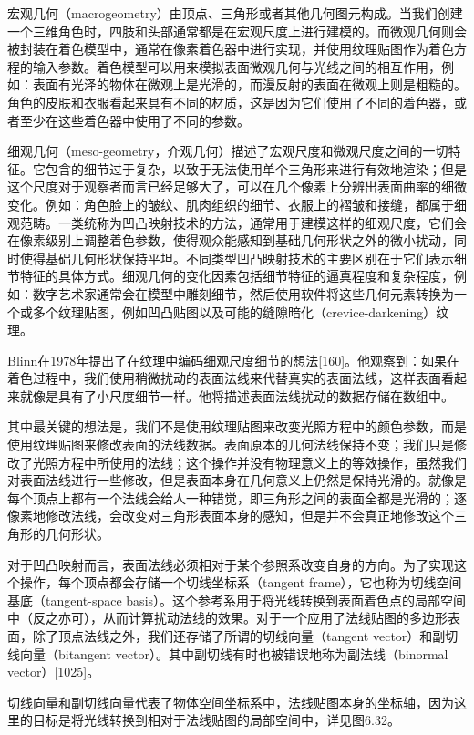 \documentclass[
  paper=a4,
  ,captions=tableheading
]{scrartcl}
\begin{document}
宏观几何（macrogeometry）由顶点、三角形或者其他几何图元构成。当我们创建一个三维角色时，四肢和头部通常都是在宏观尺度上进行建模的。而微观几何则会被封装在着色模型中，通常在像素着色器中进行实现，并使用纹理贴图作为着色方程的输入参数。着色模型可以用来模拟表面微观几何与光线之间的相互作用，例如：表面有光泽的物体在微观上是光滑的，而漫反射的表面在微观上则是粗糙的。角色的皮肤和衣服看起来具有不同的材质，这是因为它们使用了不同的着色器，或者至少在这些着色器中使用了不同的参数。

细观几何（meso-geometry，介观几何）描述了宏观尺度和微观尺度之间的一切特征。它包含的细节过于复杂，以致于无法使用单个三角形来进行有效地渲染；但是这个尺度对于观察者而言已经足够大了，可以在几个像素上分辨出表面曲率的细微变化。例如：角色脸上的皱纹、肌肉组织的细节、衣服上的褶皱和接缝，都属于细观范畴。一类统称为凹凸映射技术的方法，通常用于建模这样的细观尺度，它们会在像素级别上调整着色参数，使得观众能感知到基础几何形状之外的微小扰动，同时使得基础几何形状保持平坦。不同类型凹凸映射技术的主要区别在于它们表示细节特征的具体方式。细观几何的变化因素包括细节特征的逼真程度和复杂程度，例如：数字艺术家通常会在模型中雕刻细节，然后使用软件将这些几何元素转换为一个或多个纹理贴图，例如凹凸贴图以及可能的缝隙暗化（crevice-darkening）纹理。

Blinn在1978年提出了在纹理中编码细观尺度细节的想法{[}160{]}。他观察到：如果在着色过程中，我们使用稍微扰动的表面法线来代替真实的表面法线，这样表面看起来就像是具有了小尺度细节一样。他将描述表面法线扰动的数据存储在数组中。

其中最关键的想法是，我们不是使用纹理贴图来改变光照方程中的颜色参数，而是使用纹理贴图来修改表面的法线数据。表面原本的几何法线保持不变；我们只是修改了光照方程中所使用的法线；这个操作并没有物理意义上的等效操作，虽然我们对表面法线进行一些修改，但是表面本身在几何意义上仍然是保持光滑的。就像是每个顶点上都有一个法线会给人一种错觉，即三角形之间的表面全都是光滑的；逐像素地修改法线，会改变对三角形表面本身的感知，但是并不会真正地修改这个三角形的几何形状。

对于凹凸映射而言，表面法线必须相对于某个参照系改变自身的方向。为了实现这个操作，每个顶点都会存储一个切线坐标系（tangent
frame），它也称为切线空间基底（tangent-space
basis）。这个参考系用于将光线转换到表面着色点的局部空间中（反之亦可），从而计算扰动法线的效果。对于一个应用了法线贴图的多边形表面，除了顶点法线之外，我们还存储了所谓的切线向量（tangent
vector）和副切线向量（bitangent
vector）。其中副切线有时也被错误地称为副法线（binormal
vector）{[}1025{]}。

切线向量和副切线向量代表了物体空间坐标系中，法线贴图本身的坐标轴，因为这里的目标是将光线转换到相对于法线贴图的局部空间中，详见图6.32。
\end{document}
